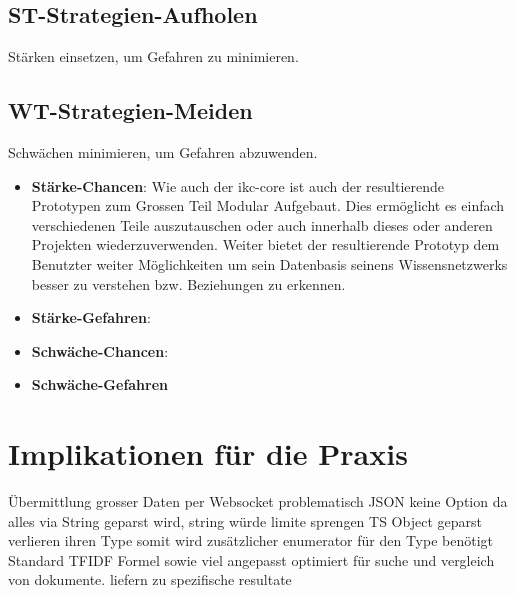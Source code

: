 \subsection{ST-Strategien-Aufholen}
Stärken einsetzen, um Gefahren zu minimieren.

\subsection{WT-Strategien-Meiden}
Schwächen minimieren, um Gefahren abzuwenden.


\begin{itemize}
    \item \textbf{Stärke-Chancen}: Wie auch der \gls{ikc-core} ist auch der resultierende Prototypen zum Grossen Teil Modular Aufgebaut. Dies ermöglicht es einfach verschiedenen Teile auszutauschen oder auch innerhalb dieses oder anderen Projekten wiederzuverwenden. Weiter bietet der resultierende Prototyp dem Benutzter weiter Möglichkeiten um sein Datenbasis seinens Wissensnetzwerks besser zu verstehen bzw. Beziehungen zu erkennen. 
    \item \textbf{Stärke-Gefahren}:  
    \item \textbf{Schwäche-Chancen}: 
    \item \textbf{Schwäche-Gefahren}
\end{itemize}


\section{Implikationen für die Praxis}

Übermittlung grosser Daten per Websocket problematisch
JSON keine Option da alles via String geparst wird, string würde limite sprengen
TS Object geparst verlieren ihren Type somit wird zusätzlicher enumerator für den Type benötigt
Standard TFIDF Formel sowie viel angepasst optimiert für suche und vergleich von dokumente. liefern zu spezifische resultate



